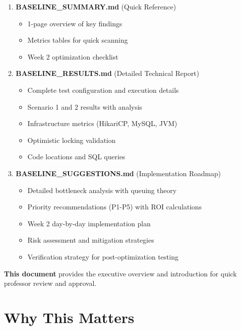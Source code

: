 \documentclass[12pt,a4paper,oneside]{report}
\begin{document}
\begin{enumerate}[leftmargin=1.5em,topsep=0.3em,itemsep=0.3em]
    \item \textbf{BASELINE\_SUMMARY.md} (Quick Reference)
    \begin{itemize}[topsep=0.2em,itemsep=0.1em]
        \item 1-page overview of key findings
        \item Metrics tables for quick scanning
        \item Week 2 optimization checklist
    \end{itemize}

    \item \textbf{BASELINE\_RESULTS.md} (Detailed Technical Report)
    \begin{itemize}[topsep=0.2em,itemsep=0.1em]
        \item Complete test configuration and execution details
        \item Scenario 1 and 2 results with analysis
        \item Infrastructure metrics (HikariCP, MySQL, JVM)
        \item Optimistic locking validation
        \item Code locations and SQL queries
    \end{itemize}

    \item \textbf{BASELINE\_SUGGESTIONS.md} (Implementation Roadmap)
    \begin{itemize}[topsep=0.2em,itemsep=0.1em]
        \item Detailed bottleneck analysis with queuing theory
        \item Priority recommendations (P1-P5) with ROI calculations
        \item Week 2 day-by-day implementation plan
        \item Risk assessment and mitigation strategies
        \item Verification strategy for post-optimization testing
    \end{itemize}
\end{enumerate}

\textbf{This document} provides the executive overview and introduction for quick professor review and approval.

\section{Why This Matters}
\end{document}
